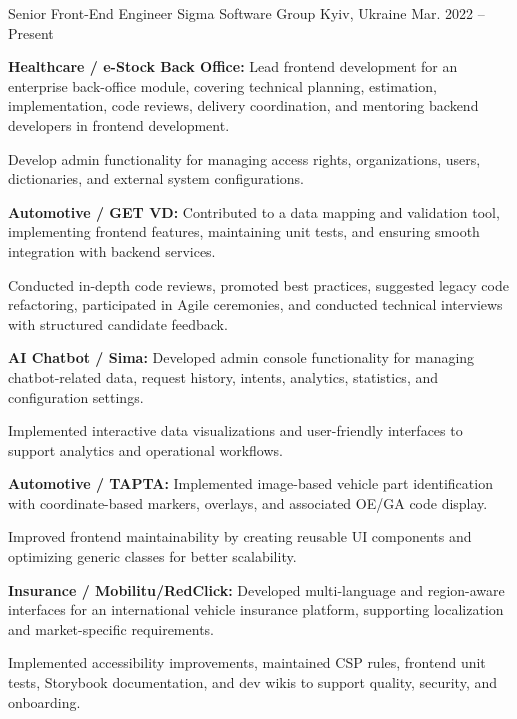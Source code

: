 
\begin{cventries}

  \cventry
  {Senior Front-End Engineer}
  {Sigma Software Group}
  {Kyiv, Ukraine}
  {Mar. 2022 -- Present}
  {
    \begin{cvitems}
      \item {\textbf{Healthcare / e-Stock Back Office:} Lead frontend development for an enterprise back-office module, covering technical planning, estimation, implementation, code reviews, delivery coordination, and mentoring backend developers in frontend development.}
      \item {Develop admin functionality for managing access rights, organizations, users, dictionaries, and external system configurations.}
      \item {\textbf{Automotive / GET VD:} Contributed to a data mapping and validation tool, implementing frontend features, maintaining unit tests, and ensuring smooth integration with backend services.}
      \item {Conducted in-depth code reviews, promoted best practices, suggested legacy code refactoring, participated in Agile ceremonies, and conducted technical interviews with structured candidate feedback.}
      \item {\textbf{AI Chatbot / Sima:} Developed admin console functionality for managing chatbot-related data, request history, intents, analytics, statistics, and configuration settings.}
      \item {Implemented interactive data visualizations and user-friendly interfaces to support analytics and operational workflows.}
      \item {\textbf{Automotive / TAPTA:} Implemented image-based vehicle part identification with coordinate-based markers, overlays, and associated OE/GA code display.}
      \item {Improved frontend maintainability by creating reusable UI components and optimizing generic classes for better scalability.}
      \item {\textbf{Insurance / Mobilitu/RedClick:} Developed multi-language and region-aware interfaces for an international vehicle insurance platform, supporting localization and market-specific requirements.}
      \item {Implemented accessibility improvements, maintained CSP rules, frontend unit tests, Storybook documentation, and dev wikis to support quality, security, and onboarding.}
    \end{cvitems}
  }


\end{cventries}
